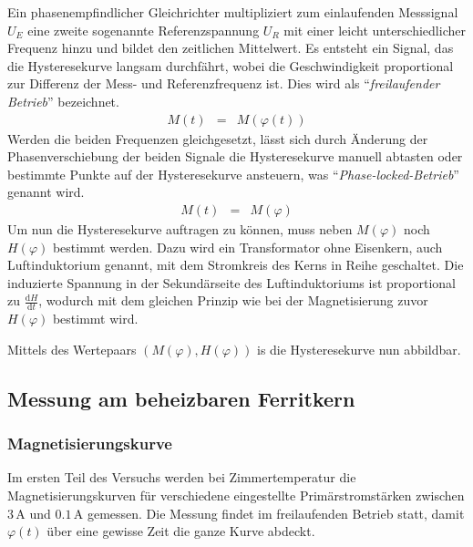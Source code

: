 \documentclass[12pt,a4paper]{scrartcl}
\numberwithin{equation}{section} %
\renewcommand{\[}{} %
\renewcommand{\]}{\noindent} %
\begin{document}
\hypertarget{bestimmung-von-mvarphi}{\label{bestimmung-von-mvarphi}}
Ein phasenempfindlicher Gleichrichter multipliziert zum einlaufenden Messsignal \(U_E\) eine zweite sogenannte Referenzspannung \(U_R\) mit einer leicht unterschiedlicher Frequenz hinzu und bildet den zeitlichen Mittelwert. Es entsteht ein Signal, das die Hysteresekurve langsam durchfährt, wobei die Geschwindigkeit proportional zur Differenz der Mess- und Referenzfrequenz ist. Dies wird als ``\emph{freilaufender Betrieb}'' bezeichnet.
\begin{eqnarray}
    M(t) &=& M(\varphi(t))
\end{eqnarray}
Werden die beiden Frequenzen gleichgesetzt, lässt sich durch Änderung der Phasenverschiebung der beiden Signale die Hysteresekurve manuell abtasten oder bestimmte Punkte auf der Hysteresekurve ansteuern, was ``\emph{Phase-locked-Betrieb}'' genannt wird.
\begin{eqnarray}
    M(t) &=& M(\varphi)
\end{eqnarray}
\hypertarget{bestimmung-von-hvarphi}{\label{bestimmung-von-hvarphi}}Um nun die Hysteresekurve auftragen zu können, muss neben \(M(\varphi)\) noch \(H(\varphi)\) bestimmt werden. Dazu wird ein Transformator ohne Eisenkern, auch Luftinduktorium genannt, mit dem Stromkreis des Kerns in Reihe geschaltet. Die induzierte Spannung in der Sekundärseite des Luftinduktoriums ist proportional zu \(\frac{\mathrm dH}{\mathrm dt}\), wodurch mit dem gleichen Prinzip wie bei der Magnetisierung zuvor \(H(\varphi)\) bestimmt wird.

Mittels des Wertepaars \((M(\varphi), H(\varphi))\) is die Hysteresekurve nun abbildbar.

\hypertarget{messung-am-beheizbaren-ferritkern}{%
\subsection{Messung am beheizbaren Ferritkern}\label{messung-am-beheizbaren-ferritkern}}

\hypertarget{magnetisierungskurve}{%
\subsubsection{Magnetisierungskurve}\label{magnetisierungskurve}}
Im ersten Teil des Versuchs werden bei Zimmertemperatur die Magnetisierungskurven für verschiedene eingestellte Primärstromstärken zwischen \(3\,\mathrm A\) und \(0.1\,\mathrm A\) gemessen. Die Messung findet im freilaufenden Betrieb statt, damit \(\varphi(t)\) über eine gewisse Zeit die ganze Kurve abdeckt.
\end{document}
